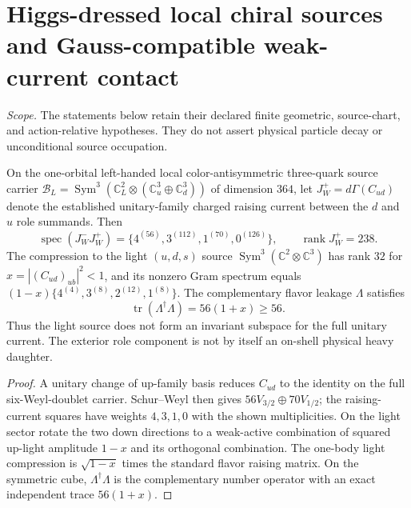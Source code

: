 \documentclass[12pt,a4paper]{article}
\begin{document}
\section{Higgs-dressed local chiral sources and Gauss-compatible weak-current contact}
\noindent\emph{Scope.} The statements below retain their declared finite geometric, source-chart, and action-relative hypotheses. They do not assert physical particle decay or unconditional source occupation.

\begin{proposition}
\label{p5c:prop:v368-chiral-full-current-and-leakage}
On the one-orbital left-handed local color-antisymmetric three-quark
source carrier
$\mathcal B_L=\operatorname{Sym}^3(\mathbb C^2_L\otimes
(\mathbb C_u^3\oplus\mathbb C_d^3))$ of dimension $364$,
let $J_W^+=d\Gamma(C_{ud})$ denote the established unitary-family
charged raising current between the $d$ and $u$ role summands.
Then
\[
\operatorname{spec}(J_W^-J_W^+)=
\{4^{(56)},3^{(112)},1^{(70)},0^{(126)}\},\qquad
\operatorname{rank}J_W^+=238.
\]
The compression to the light $(u,d,s)$ source
$\operatorname{Sym}^3(\mathbb C^2\otimes\mathbb C^3)$
has rank $32$ for $x=|(C_{ud})_{ub}|^2<1$, and
its nonzero Gram spectrum equals
$(1-x)\{4^{(4)},3^{(8)},2^{(12)},1^{(8)}\}$.
The complementary flavor leakage $\Lambda$ satisfies
\[
 \operatorname{tr}(\Lambda^\dagger\Lambda)=56(1+x)\ge56.
\]
Thus the light source does not form an invariant subspace for the
full unitary current. The exterior role component is not by itself
an on-shell physical heavy daughter.
\end{proposition}
\begin{proof}
A unitary change of up-family basis reduces $C_{ud}$ to the
identity on the full six-Weyl-doublet carrier.  Schur--Weyl
then gives $56V_{3/2}\oplus70V_{1/2}$; the raising-current
squares have weights $4,3,1,0$ with the shown multiplicities.
On the light sector rotate the two down directions to a weak-active
combination of squared up-light amplitude $1-x$ and its orthogonal
combination. The one-body light compression is $\sqrt{1-x}$ times
the standard flavor raising matrix. On the symmetric cube,
$\Lambda^\dagger\Lambda$ is the complementary number operator
with an exact independent trace $56(1+x)$.
\end{proof}
\end{document}
